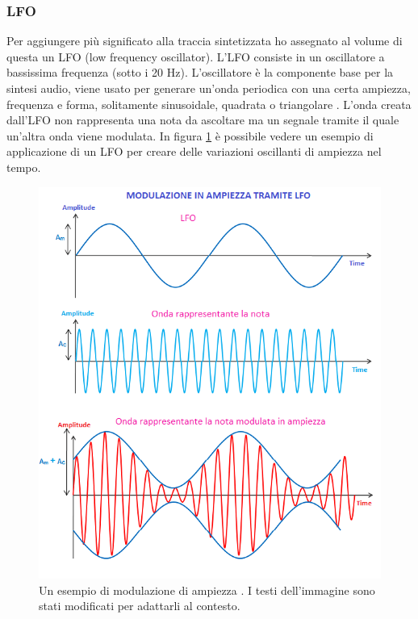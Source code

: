 \subsubsection{LFO}
Per aggiungere più significato alla traccia sintetizzata ho assegnato al volume di questa un LFO (low frequency oscillator).
L'LFO consiste in un oscillatore a bassissima frequenza (sotto i 20 Hz). L'oscillatore è la componente base per la sintesi audio, viene usato per generare un'onda periodica con una certa ampiezza, frequenza e forma, solitamente sinusoidale, quadrata o triangolare \cite{izotope}.
L'onda creata dall'LFO non rappresenta una nota da ascoltare ma un segnale tramite il quale un'altra onda viene modulata.
In figura \ref{fig:lfo} è possibile vedere un esempio di applicazione di un LFO per creare delle variazioni oscillanti di ampiezza nel tempo.
\begin{figure}[H]
    \includegraphics[width=\linewidth]{img/lfo.png}
    \caption{Un esempio di modulazione di ampiezza \cite{lfo_img}. I testi dell'immagine sono stati modificati per adattarli al contesto.}
    \label{fig:lfo}
\end{figure}
